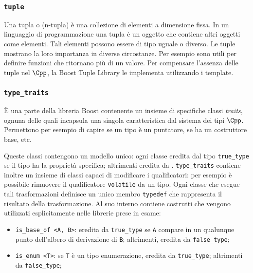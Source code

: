 \subsubsection{{\tt tuple}}
Una tupla o (n-tupla) è una collezione di elementi a dimensione fissa.
In un linguaggio di programmazione una tupla è un oggetto che contiene
altri oggetti come elementi. Tali elementi possono essere di tipo uguale
o diverso.
Le tuple mostrano la loro importanza in diverse circostanze. Per esempio
sono utili per definire funzioni che ritornano più di un valore.
Per compensare l'assenza delle tuple nel $\Cpp$, la Boost Tuple Library 
le implementa utilizzando i template.

\subsubsection{{\tt type\_traits}}
È una parte della libreria Boost contenente un insieme di specifiche
classi \textit{traits}, ognuna delle quali incapsula una singola
caratteristica dal sistema dei tipi $\Cpp$.
Permettono per esempio di capire se un tipo è un puntatore, se ha un
costruttore base, etc.

Queste classi contengono un modello unico: ogni classe eredita dal tipo
{\tt true\_type} se il tipo ha la proprietà specifica; altrimenti
eredita da .
{\tt type\_traits} contiene inoltre un insieme di classi capaci di
modificare i qualificatori: per esempio è possibile rimuovere il
qualificatore {\tt volatile} da un tipo.
Ogni classe che esegue tali trasformazioni definisce un unico membro
{\tt typedef} che rappresenta il risultato della trasformazione.
Al suo interno contiene costrutti che vengono utilizzati esplicitamente
nelle librerie prese in esame:
\begin{itemize}
  \item {\tt is\_base\_of <A, B>}: eredita da {\tt true\_type} se
  {\tt A} compare in un qualunque punto dell'albero di derivazione di
  {\tt B}; altrimenti, eredita da {\tt false\_type};
  \item {\tt is\_enum <T>}: se {\tt T} è un tipo enumerazione, eredita da
  {\tt true\_type}; altrimenti da {\tt false\_type}; 
\end{itemize}
